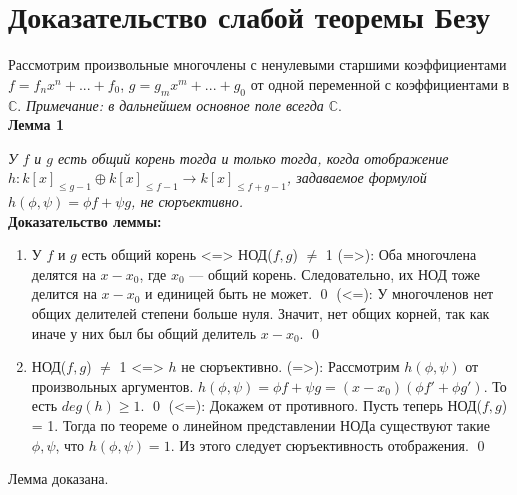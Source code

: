 \documentclass[a4paper, 12pt]{article}
\begin{document}
\section{Доказательство слабой теоремы Безу}

Рассмотрим произвольные многочлены с ненулевыми старшими коэффициентами $f=f_nx^n + ... + f_0$, $g=g_mx^m + ... + g_0$ от одной переменной с коэффициентами в $\mathbb{C}$.\newline
\textit{Примечание: в дальнейшем основное поле всегда $\mathbb{C}$}.\\

\textbf{Лемма 1}

\textit{У $f$ и $g$ есть общий корень тогда и только тогда, когда отображение $h:k[x]_{\leq g-1} \oplus k[x]_{\leq f-1} \rightarrow k[x]_{\leq f+g-1}$, задаваемое формулой $h(\phi,\psi) = \phi f + \psi g$, не сюръективно.}\\

\textbf{Доказательство леммы:}\newline
\begin{enumerate}
  \item У $f$ и $g$ есть общий корень <=> НОД($f,g$) $\neq$ 1\newline
  (=>): Оба многочлена делятся на $x-x_0$, где $x_0$ --- общий корень. Следовательно, их НОД тоже делится на $x-x_0$ и единицей быть не может. \qed\newline
  (<=): У многочленов нет общих делителей степени больше нуля. Значит, нет общих корней, так как иначе у них был бы общий делитель $x-x_0$. \qed
  \item НОД($f,g$) $\neq$ 1 <=> $h$ не сюръективно.\newline
  (=>): Рассмотрим $h(\phi,\psi)$ от произвольных аргументов. $h(\phi,\psi)=\phi f + \psi g=(x-x_0)(\phi f' + \phi g')$. То есть $deg(h) \geq 1$. \qed\newline
  (<=): Докажем от противного. Пусть теперь НОД($f,g$) = 1. Тогда по теореме о линейном представлении НОДа существуют такие $\phi,\psi$, что $h(\phi,\psi)=1$. Из этого следует сюръективность отображения. \qed
\end{enumerate}
Лемма доказана.\\
\end{document}
